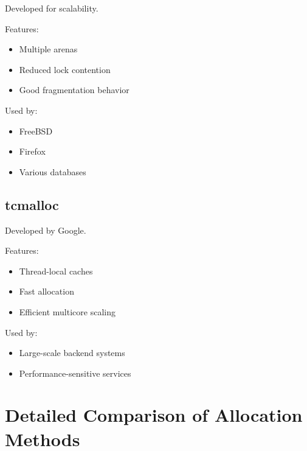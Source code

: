 Developed for scalability.

Features:

\begin{itemize}
\item Multiple arenas
\item Reduced lock contention
\item Good fragmentation behavior
\end{itemize}

Used by:

\begin{itemize}
\item FreeBSD
\item Firefox
\item Various databases
\end{itemize}

\subsection{tcmalloc}

Developed by Google.

Features:

\begin{itemize}
\item Thread-local caches
\item Fast allocation
\item Efficient multicore scaling
\end{itemize}

Used by:

\begin{itemize}
\item Large-scale backend systems
\item Performance-sensitive services
\end{itemize}

\section{Detailed Comparison of Allocation Methods}

